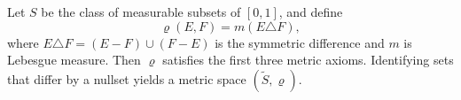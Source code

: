 Let $S$ be the class of measurable subsets of $[0,1]$, and define
$$\varrho(E, F) = m(E \triangle F),$$
where $E \triangle F = (E - F) \cup (F - E)$ is the symmetric difference and $m$ is Lebesgue measure. Then $\varrho$ satisfies the first three metric axioms. Identifying sets that differ by a nullset yields a metric space $(\tilde{S}, \varrho)$.
